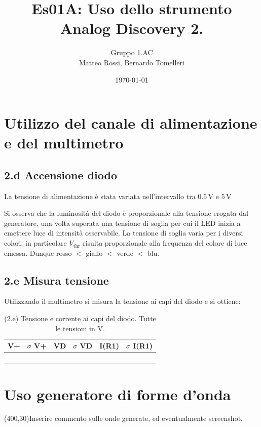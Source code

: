 \documentclass[10pt,a4paper]{article}
\author{Gruppo 1.AC \\ Matteo Rossi, Bernardo Tomelleri}
\title{Es01A: Uso dello strumento Analog Discovery 2.}
\newcommand{\exn}{\phantom{xxx}}
\begin{document}
\date{\today}
\maketitle

\setcounter{section}{1}

\section{Utilizzo del canale di alimentazione e del multimetro}

\subsection*{2.d Accensione diodo}

La tensione di alimentazione \`e stata variata nell'intervallo tra
$0.5\,\mathrm{V}$ e $5\,\mathrm{V}$


Si osserva che la luminosit\`a del diodo è proporzionale alla tensione
erogata dal generatore, una volta superata una tensione di soglia per cui
il LED inizia a emettere luce di intensità osservabile. La tensione di soglia
varia per i diversi colori; in particolare $V_{\mathrm{thr}}$ risulta
proporzionale alla frequenza del colore di luce emessa. Dunque
rosso $<$ giallo $<$ verde $<$ blu.

\subsection*{2.e Misura tensione}
Utilizzando il multimetro si misura la tensione ai capi del diodo e si ottiene:

\begin{table}[h]
\centering
\begin{tabular}{|c|c|c|c|c|c|}
\hline 
V+& $\sigma$ V+  & VD & $\sigma$ VD & I(R1)  & $\sigma$ I(R1) \\
\hline 
\exn & \exn & \exn & \exn & \exn &\exn \\
\exn & \exn & \exn & \exn & \exn &\exn \\
\exn & \exn & \exn & \exn & \exn &\exn \\
\exn & \exn & \exn & \exn & \exn &\exn \\
\hline 
\end{tabular} 
\caption{(2.e) Tensione e corrente ai capi del diodo.
Tutte le tensioni in V.\label{t:par1}}
\end{table}

\section{Uso generatore di forme d'onda}
\exn 
\par
\vspace{0.5cm}
\framebox(400,30){Inserire commento sulle onde generate, ed eventualmente
screenshot.}
\end{document}

